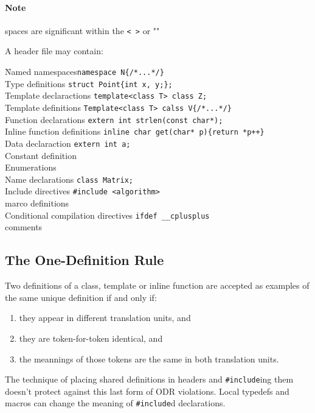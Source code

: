 \documentclass[11pt, a4paper]{book}
\begin{document}
\begin{itemize}
\paragraph{Note} spaces are significant within the \verb|< >| or ""

A header file may contain:

\begin{tabbing}
\hspace{1cm}\= Named namespaces\hspace{3cm}\quad\= \verb|namespace N{/*...*/}|\\
	\>Type definitions \>\verb|struct Point{int x, y;};|\\
	\>Template declaractions \>\verb|template<class T> class Z;|\\
	\>Template definitions \>\verb|Template<class T> calss V{/*...*/}|\\
	\>Function declarations \>\verb|extern int strlen(const char*);|\\
	\>Inline function definitions \>\verb|inline char get(char* p){return *p++}|\\
	\>Data declaraction \>\verb|extern int a;|\\
	\>Constant definition\\
	\>Enumerations\\
	\>Name declarations \>\verb|class Matrix;|\\
	\>Include directives \>\verb|#include <algorithm>|\\
	\>marco definitions\\
	\>Conditional compilation directives \>\verb|ifdef __cplusplus|\\
	\>comments\\


\end{tabbing}

\subsection{The One-Definition Rule}
Two definitions of a class, template or inline function are accepted as examples of the same unique definition if and only if:
\begin{enumerate}
\item they appear in different translation units, and
\item they are token-for-token identical, and
\item the meannings of those tokens are the same in both translation units.
\end{enumerate}
The technique of placing shared definitions in headers and \verb|#include|ing them doesn't protect against this last form of ODR violations. Local typedefs and macros can change the meaning of \verb|#include|d declarations.


\end{itemize}
\end{document}
